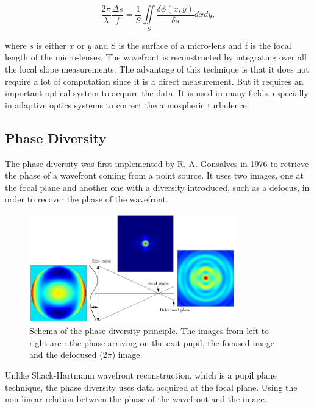 \begin{equation}
\frac{2\pi}{\lambda}\frac{\Delta s}{f} = \frac{1}{S} \iint\limits_S \frac{\delta\phi (x,y)}{\delta s}dxdy,
\label{eqt:SHWFSlope}
\end{equation}

where $s$ is either $x$ or $y$ and S is the surface of a micro-lens and f is the focal length of the micro-lenses. The wavefront is reconstructed by integrating over all the local slope measurements. The advantage of this technique is that it does not require a lot of computation since it is a direct measurement. But it requires an important optical system to acquire the data. It is used in many fields, especially in adaptive optics systems to correct the atmospheric turbulence.

\subsection{Phase Diversity}
\label{subsec:PDprinciple}

The phase diversity was first implemented by R. A. Gonsalves in 1976 \citep{Gonsalves_1976,Gonsalves_1982} to retrieve the phase of a wavefront coming from a point source. It uses two images, one at the focal plane and another one with a diversity introduced, such as a defocus, in order to recover the phase of the wavefront.

\begin{figure}
\begin{center}
\includegraphics[width=0.8\textwidth,angle=0]{Figures/DiversityPrincipleM}
\decoRule
\caption{Schema of the phase diversity principle. The images from left to right are : the phase arriving on the exit pupil, the focused image and the defocused ($2\pi$) image.}
\label{fig:DiversityPrinciple}
\end{center}
\end{figure}

Unlike Shack-Hartmann wavefront reconstruction, which is a pupil plane technique, the phase diversity uses data acquired at the focal plane. Using the non-linear relation between the phase of the wavefront and the image, 

